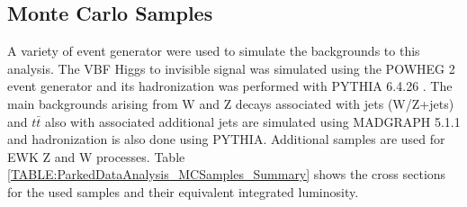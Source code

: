 \subsection{Monte Carlo Samples}


A variety of event generator were used to simulate the backgrounds to this analysis. The \gls{VBF} Higgs to invisible signal was simulated using the \textsc{POWHEG} 2 event generator \cite{ARTICLE:POWHEG_2004,ARTICLE:POWHEG_2007,ARTICLE:POWHEG_2009v1,ARTICLE:POWHEG_2009v2,ARTICLE:POWHEG_2010v1,ARTICLE:POWHEG_2010v2,ARTICLE:POWHEG_2011v1,ARTICLE:POWHEG_2011v2} and its hadronization was performed with \textsc{PYTHIA} 6.4.26 \cite{ARTICLE:Pythia6p4PhysicsAndManual}. The main backgrounds arising from W and Z decays associated with jets (W/Z+jets) and $t\bar{t}$ also with associated additional jets are simulated using \textsc{MADGRAPH} 5.1.1 \cite{ARTICLE:MadGraph5,ARTICLE:aMCatNLO} and hadronization is also done using \textsc{PYTHIA}. Additional samples are used for \gls{EWK} Z and W processes. Table \ref{TABLE:ParkedDataAnalysis_MCSamples_Summary} shows the cross sections for the used samples and their equivalent integrated luminosity.

